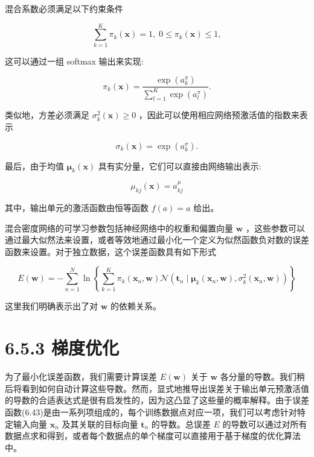 \documentclass[10pt]{article}
\begin{document}
混合系数必须满足以下约束条件

\[
\mathop{\sum }\limits_{{k = 1}}^{K}{\pi }_{k}\left( \mathbf{x}\right)  = 1,\;0 \leq  {\pi }_{k}\left( \mathbf{x}\right)  \leq  1, \tag{6.39}
\]

这可以通过一组 softmax 输出来实现:

\[
{\pi }_{k}\left( \mathbf{x}\right)  = \frac{\exp \left( {a}_{k}^{\pi }\right) }{\mathop{\sum }\limits_{{l = 1}}^{K}\exp \left( {a}_{l}^{\pi }\right) }. \tag{6.40}
\]

类似地，方差必须满足 \({\sigma }_{k}^{2}\left( \mathbf{x}\right)  \geq  0\) ，因此可以使用相应网络预激活值的指数来表示

\[
{\sigma }_{k}\left( \mathbf{x}\right)  = \exp \left( {a}_{k}^{\sigma }\right) . \tag{6.41}
\]

最后，由于均值 \({\mathbf{\mu }}_{k}\left( \mathbf{x}\right)\) 具有实分量，它们可以直接由网络输出表示:

\[
{\mu }_{kj}\left( \mathbf{x}\right)  = {a}_{kj}^{\mu } \tag{6.42}
\]

其中，输出单元的激活函数由恒等函数 \(f\left( a\right)  = a\) 给出。

混合密度网络的可学习参数包括神经网络中的权重和偏置向量 \(\mathbf{w}\) ，这些参数可以通过最大似然法来设置，或者等效地通过最小化一个定义为似然函数负对数的误差函数来设置。对于独立数据，这个误差函数具有如下形式

\[
E\left( \mathbf{w}\right)  =  - \mathop{\sum }\limits_{{n = 1}}^{N}\ln \left\{  {\mathop{\sum }\limits_{{k = 1}}^{K}{\pi }_{k}\left( {{\mathbf{x}}_{n},\mathbf{w}}\right) \mathcal{N}\left( {{\mathbf{t}}_{n} \mid  {\mathbf{\mu }}_{k}\left( {{\mathbf{x}}_{n},\mathbf{w}}\right) ,{\sigma }_{k}^{2}\left( {{\mathbf{x}}_{n},\mathbf{w}}\right) }\right) }\right\}   \tag{6.43}
\]

这里我们明确表示出了对 \(\mathbf{w}\) 的依赖关系。

\section*{6.5.3 梯度优化}

为了最小化误差函数，我们需要计算误差 \(E\left( \mathbf{w}\right)\) 关于 \(\mathbf{w}\) 各分量的导数。我们稍后将看到如何自动计算这些导数。然而，显式地推导出误差关于输出单元预激活值的导数的合适表达式是很有启发性的，因为这凸显了这些量的概率解释。由于误差函数(6.43)是由一系列项组成的，每个训练数据点对应一项，我们可以考虑针对特定输入向量 \({\mathbf{x}}_{n}\) 及其关联的目标向量 \({\mathbf{t}}_{n}\) 的导数。总误差 \(E\) 的导数可以通过对所有数据点求和得到，或者每个数据点的单个梯度可以直接用于基于梯度的优化算法中。
\end{document}
